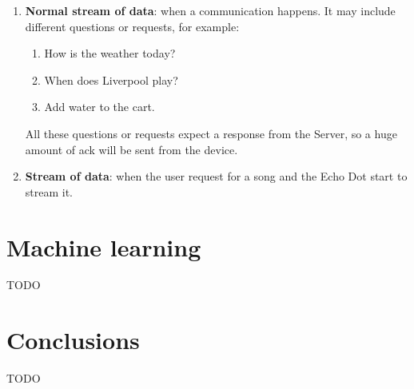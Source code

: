 \documentclass[sigconf]{acmart}
\begin{document}
\begin{enumerate}
        \item \textbf{Normal stream of data}: when a communication happens.
        It may include different questions or requests, for example:
        \begin{enumerate}
            \item How is the weather today?
            \item When does Liverpool play?
            \item Add water to the cart.
        \end{enumerate}
        All these questions or requests expect a response from the Server, so a huge amount of ack will be sent from the device.
        \item \textbf{Stream of data}: when the user request for a song and the Echo Dot start to stream it.
    \end{enumerate}


    \section{Machine learning}
    TODO


    \section{Conclusions}
    TODO

    
    
\end{document}
